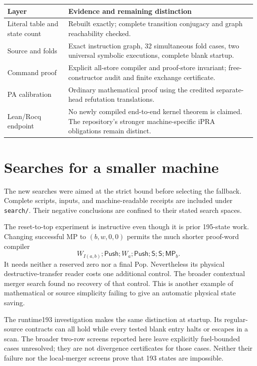 \documentclass[11pt,letterpaper]{article}
\newcommand{\file}[1]{\texttt{\nolinkurl{#1}}}
\begin{document}
\begin{center}\small
\begin{tabularx}{\linewidth}{@{}lX@{}}
\toprule Layer & Evidence and remaining distinction\\\midrule
Literal table and state count & Rebuilt exactly; complete transition
 conjugacy and graph reachability checked.\\
Source and folds & Exact instruction graph, 32 simultaneous fold cases,
 two universal symbolic executions, complete blank startup.\\
Command proof & Explicit all-store compiler and proof-store invariant;
 free-constructor audit and finite exchange certificate.\\
PA calibration & Ordinary mathematical proof using the credited
 separate-head refutation translations.\\
Lean/Rocq endpoint & No newly compiled end-to-end kernel theorem is
 claimed. The repository's stronger machine-specific iPRA obligations
 remain distinct.\\
\bottomrule
\end{tabularx}
\end{center}

\section{Searches for a smaller machine}\label{sec:search}

The new searches were aimed at the strict bound before selecting the
fallback. Complete scripts, inputs, and machine-readable receipts are
included under \file{search/}. Their negative conclusions are confined
to their stated search spaces.



The reset-to-top experiment is instructive even though it is prior
195-state work. Changing successful MP to $(b,w,0,0)$ permits the much
shorter proof-word compiler
\[
 W_{I(a,b)};\mathsf{Push};W_a;\mathsf{Push};
                  \mathsf S;\mathsf S;\mathsf{MP}_b.
\]
It needs neither a reserved zero nor a final Pop. Nevertheless its
physical destructive-transfer reader costs one additional control.
The broader contextual merger search found no recovery of that control.
This is another example of mathematical or source simplicity failing
to give an automatic physical state saving.

The runtime193 investigation makes the same distinction at startup.
Its regular-source contracts can all hold while every tested blank
entry halts or escapes in a scan. The broader two-row screens reported
here leave explicitly fuel-bounded cases unresolved; they are not
divergence certificates for those cases. Neither their failure nor
the local-merger screens prove that 193 states are impossible.
\end{document}
